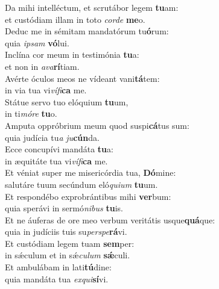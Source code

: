 \evenverse Da mihi intelléctum, et scrutábor legem \textbf{tu}am:~\*\\
\evenverse et custódiam illam in toto \textit{cor}\textit{de} \textbf{me}o.\\
\oddverse Deduc me in sémitam mandatórum tu\textbf{ó}rum:~\*\\
\oddverse quia \textit{i}\textit{psam} \textbf{vó}lui.\\
\evenverse Inclína cor meum in testimónia \textbf{tu}a:~\*\\
\evenverse et non in \textit{a}\textit{va}\textbf{rí}tiam.\\
\oddverse Avérte óculos meos ne vídeant vani\textbf{tá}tem:~\*\\
\oddverse in via tua vi\textit{ví}\textit{fi}\textbf{ca} me.\\
\evenverse Státue servo tuo elóquium \textbf{tu}um,~\*\\
\evenverse in ti\textit{mó}\textit{re} \textbf{tu}o.\\
\oddverse Amputa oppróbrium meum quod suspi\textbf{cá}tus sum:~\*\\
\oddverse quia judícia tu\textit{a} \textit{ju}\textbf{cún}da.\\
\evenverse Ecce concupívi mandáta \textbf{tu}a:~\*\\
\evenverse in æquitáte tua vi\textit{ví}\textit{fi}\textbf{ca} me.\\
\oddverse Et véniat super me misericórdia tua, \textbf{Dó}mine:~\*\\
\oddverse salutáre tuum secúndum eló\textit{qui}\textit{um} \textbf{tu}um.\\
\evenverse Et respondébo exprobrántibus mihi \textbf{ver}bum:~\*\\
\evenverse quia sperávi in sermó\textit{ni}\textit{bus} \textbf{tu}is.\\
\oddverse Et ne áuferas de ore meo verbum veritátis usque\textbf{quá}que:~\*\\
\oddverse quia in judíciis tuis su\textit{per}\textit{spe}\textbf{rá}vi.\\
\evenverse Et custódiam legem tuam \textbf{sem}per:~\*\\
\evenverse in sǽculum et in sǽ\textit{cu}\textit{lum} \textbf{sǽ}culi.\\
\oddverse Et ambulábam in lati\textbf{tú}dine:~\*\\
\oddverse quia mandáta tua \textit{ex}\textit{qui}\textbf{sí}vi.\\
